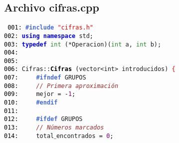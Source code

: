 \documentclass[a4paper,10pt]{scrartcl}
\begin{document}
   \subsection{Archivo cifras.cpp}
   \small
   \texttt{%
   \noindent
   \mbox{}\texttt{\textcolor{Black}{001:}} \textbf{\textcolor{RoyalBlue}{\#include}}\ \texttt{\textcolor{Red}{"{}cifras.h"{}}} \\
   \mbox{}\texttt{\textcolor{Black}{002:}} \textbf{\textcolor{Blue}{using}}\ \textbf{\textcolor{Blue}{namespace}}\ std\textcolor{BrickRed}{;} \\
   \mbox{}\texttt{\textcolor{Black}{003:}} \textbf{\textcolor{Blue}{typedef}}\ \textcolor{ForestGreen}{int}\ \textcolor{BrickRed}{(*}Operacion\textcolor{BrickRed}{)(}\textcolor{ForestGreen}{int}\ a\textcolor{BrickRed}{,}\ \textcolor{ForestGreen}{int}\ b\textcolor{BrickRed}{);}\  \\
   \mbox{}\texttt{\textcolor{Black}{004:}}  \\
   \mbox{}\texttt{\textcolor{Black}{005:}}  \\
   \mbox{}\texttt{\textcolor{Black}{006:}} Cifras\textcolor{BrickRed}{::}\textbf{\textcolor{Black}{Cifras}}\ \textcolor{BrickRed}{(}\textcolor{TealBlue}{vector\textless{}int\textgreater{}}\ introducidos\textcolor{BrickRed}{)}\ \textcolor{Red}{\{} \\
   \mbox{}\texttt{\textcolor{Black}{007:}} \textbf{\textcolor{RoyalBlue}{\ \ \ \ \#ifndef}}\ GRUPOS \\
   \mbox{}\texttt{\textcolor{Black}{008:}} \ \ \ \ \textit{\textcolor{Brown}{//\ Primera\ aproximación}} \\
   \mbox{}\texttt{\textcolor{Black}{009:}} \ \ \ \ mejor\ \textcolor{BrickRed}{=}\ \textcolor{BrickRed}{-}\textcolor{Purple}{1}\textcolor{BrickRed}{;} \\
   \mbox{}\texttt{\textcolor{Black}{010:}} \textbf{\textcolor{RoyalBlue}{\ \ \ \ \#endif}} \\
   \mbox{}\texttt{\textcolor{Black}{011:}} \ \  \\
   \mbox{}\texttt{\textcolor{Black}{012:}} \textbf{\textcolor{RoyalBlue}{\ \ \ \ \#ifdef}}\ GRUPOS \\
   \mbox{}\texttt{\textcolor{Black}{013:}} \ \ \ \ \textit{\textcolor{Brown}{//\ Números\ marcados}} \\
   \mbox{}\texttt{\textcolor{Black}{014:}} \ \ \ \ total$\_$encontrados\ \textcolor{BrickRed}{=}\ \textcolor{Purple}{0}\textcolor{BrickRed}{;} \\
}
\end{document}
